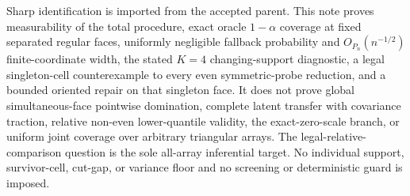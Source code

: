 \documentclass{article}
\begin{document}
Sharp identification is imported from the accepted parent. This note proves measurability of the total procedure, exact oracle \(1-\alpha\) coverage at fixed separated regular faces, uniformly negligible fallback probability and \(O_{P_n}(n^{-1/2})\) finite-coordinate width, the stated \(K=4\) changing-support diagnostic, a legal singleton-cell counterexample to every even symmetric-probe reduction, and a bounded oriented repair on that singleton face. It does not prove global simultaneous-face pointwise domination, complete latent transfer with covariance traction, relative non-even lower-quantile validity, the exact-zero-scale branch, or uniform joint coverage over arbitrary triangular arrays. The legal-relative-comparison question is the sole all-array inferential target. No individual support, survivor-cell, cut-gap, or variance floor and no screening or deterministic guard is imposed.
\end{document}
